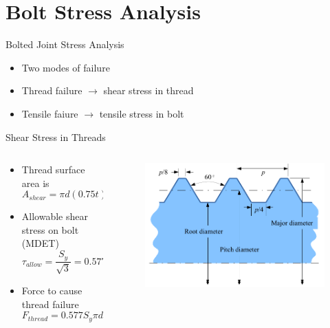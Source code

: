 \documentclass[10pt, svgnames]{beamer}
\begin{document}
\section{Bolt Stress Analysis}
\label{sec:orgb3a9244}

\begin{frame}[label={sec:orgb62d8b5}]{Bolted Joint Stress Analysis}
\begin{itemize}
  \item Two modes of failure
  \item Thread failure $\rightarrow$ shear stress in thread
  \item Tensile faiure $\rightarrow$ tensile stress in bolt
\end{itemize}
\end{frame}

\begin{frame}[label={sec:org3982c6f}]{Shear Stress in Threads}
\begin{columns}
  \begin{column}{0.5\textwidth}
    \begin{itemize}
      \item Thread surface area is
            $$ A_{shear} = \pi d (0.75 t) $$
      \item Allowable shear stress on bolt (MDET)
            \begin{equation*}
              \tau_{allow} = \frac{S_{y}}{\sqrt{3}} = 0.577S_{y}
            \end{equation*}
      \item Force to cause thread failure
            \begin{equation*}
              F_{thread} = 0.577S_{y}\pi d (0.75) t
            \end{equation*}
    \end{itemize}
  \end{column}
  \begin{column}{0.5\textwidth}
        \begin{figure}[h]
          \centering
          \includegraphics[scale=0.6]{pictures/bolt-terminology}
        \end{figure}
  \end{column}
\end{columns}
\end{frame}
\end{document}
